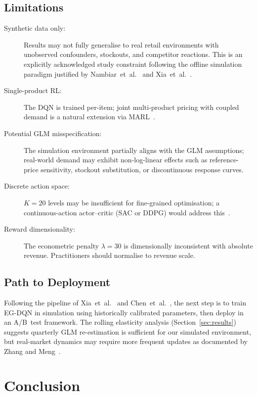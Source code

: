 \documentclass[journal, 10pt, twoside]{IEEEtran}
\begin{document}
\subsection{Limitations}

\begin{description}
  \item[Synthetic data only:] Results may not fully generalise to real
    retail environments with unobserved confounders, stockouts, and
    competitor reactions. This is an explicitly acknowledged study
    constraint following the offline simulation paradigm justified by
    Nambiar~et~al.~\cite{nambiar2022} and Xia~et~al.~\cite{xia2024}.
  \item[Single-product RL:] The DQN is trained per-item; joint
    multi-product pricing with coupled demand is a natural extension via
    MARL~\cite{hadi2025, kumar2026}.
  \item[Potential GLM misspecification:] The simulation environment partially aligns with the GLM assumptions; real-world demand may exhibit non-log-linear effects such as reference-price sensitivity, stockout substitution, or discontinuous response curves.
  \item[Discrete action space:] $K=20$ levels may be insufficient for
    fine-grained optimisation; a continuous-action actor--critic (SAC or
    DDPG) would address this~\cite{kaur2023}.
  \item[Reward dimensionality:] The econometric penalty $\lambda=30$ is
    dimensionally inconsistent with absolute revenue. Practitioners should
    normalise to revenue scale.
\end{description}

\subsection{Path to Deployment}

Following the pipeline of Xia~et~al.~\cite{xia2024} and
Chen~et~al.~\cite{chen2023}, the next step is to train EG-DQN in
simulation using historically calibrated parameters, then deploy in an
A/B~test framework. The rolling elasticity analysis (Section~\ref{sec:results})
suggests quarterly GLM re-estimation is sufficient for our simulated
environment, but real-market dynamics may require more frequent updates
as documented by Zhang and Meng~\cite{zhang2025}.

\section{Conclusion}
\label{sec:conclusion}
\end{document}
